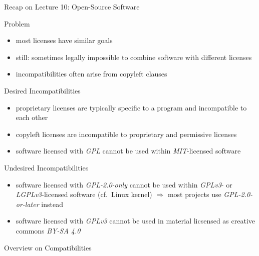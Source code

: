 \begin{frame}{Recap on Lecture 10: Open-Source Software} %
\begin{fancycolumns}
	\begin{note}{Problem}
		\begin{itemize}
			\item most licenses have similar goals
			\item still: sometimes legally impossible to combine software with different licenses
			\item incompatibilities often arise from copyleft clauses
		\end{itemize}
	\end{note}
	\begin{example}{Desired Incompatibilities}
		\begin{itemize}
			\item proprietary licenses are typically specific to a program and incompatible to each other
			\item copyleft licenses are incompatible to proprietary and permissive licenses
			\item software licensed with \emph{GPL} cannot be used within \emph{MIT}-licensed software
		\end{itemize}
	\end{example}
	\nextcolumn
	\begin{example}{Undesired Incompatibilities}
		\begin{itemize}
			\item software licensed with \emph{GPL-2.0-only} cannot be used within \emph{GPLv3}- or \emph{LGPLv3}-licensed software (cf.\ Linux kernel) $\Rightarrow$ most projects use \emph{GPL-2.0-or-later} instead
			\item software licensed with \emph{GPLv3} cannot be used in material licsensed as creative commons \emph{BY-SA 4.0} 
		\end{itemize}
	\end{example}
	\begin{exampletight}{Overview on Compatibilities}
		\centering{} %
	\end{exampletight}
\end{fancycolumns}
\end{frame}

